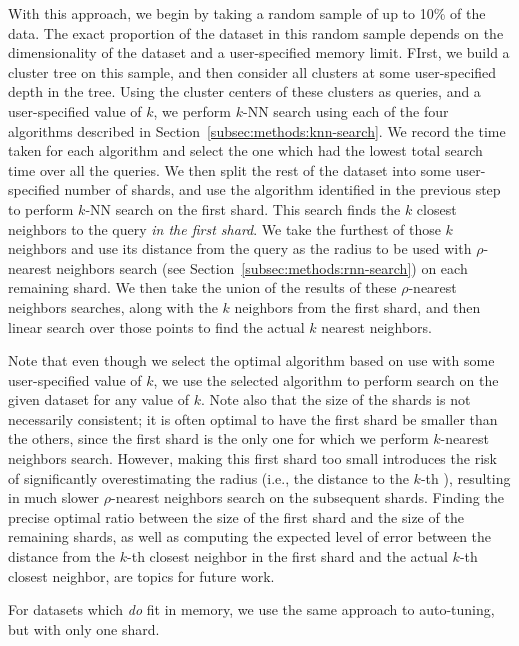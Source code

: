 With this approach, we begin by taking a random sample of up to 10\% of the data. 
The exact proportion of the dataset in this random sample depends on the dimensionality of the dataset and a user-specified memory limit. 
FIrst, we build a cluster tree on this sample, and 
then consider all clusters at some user-specified depth in the tree. Using the cluster centers 
of these clusters as queries, and a user-specified value of $k$, we perform $k$-NN search using each of the four algorithms described in Section~\ref{subsec:methods:knn-search}. 
We record the 
time taken for each algorithm and select the one which had the lowest total search time over all the queries. 
We then split the rest of the dataset into some user-specified number of shards, and use the algorithm identified in the previous step to perform $k$-NN search on the first shard. 
This search finds the $k$ closest neighbors to the query \emph{in the first shard}. 
We take the furthest of those $k$ neighbors and use its distance from the query as the radius to be used with $\rho$-nearest neighbors search (see Section~\ref{subsec:methods:rnn-search}) on each remaining shard. 
We then take the union of the results of these $\rho$-nearest neighbors searches, along with the $k$ neighbors from the first shard, and then linear search over those points to find the actual $k$ nearest neighbors.

Note that even though we select the optimal algorithm based on use with some user-specified value of $k$, we use the selected algorithm to perform search on the given dataset for any value of $k$.
Note also that the size of the shards is not necessarily consistent; it is often optimal to have the first shard be smaller than the others, since the first shard is the only one for which we perform $k$-nearest neighbors search. 
However, making this first shard too small introduces the risk of significantly overestimating the radius (i.e., the distance to the $k$-th ), resulting in much slower $\rho$-nearest neighbors search on the subsequent shards.
Finding the precise optimal ratio between the size of the first shard and the size of the remaining shards, as well as computing the expected level of error between the distance from the $k$-th closest neighbor in the first shard and the actual $k$-th closest neighbor, are topics for future work.

For datasets which \emph{do} fit in memory, we use the same approach to auto-tuning, but with only one shard.

